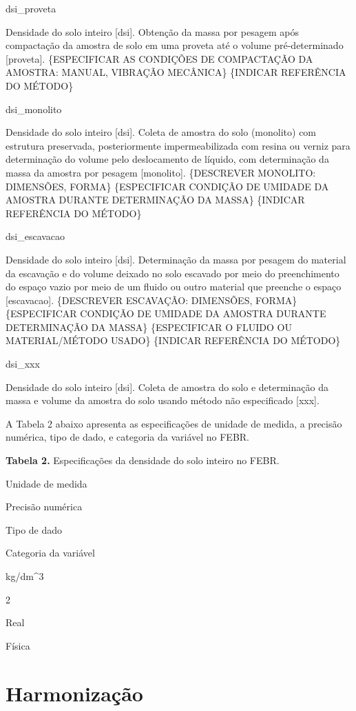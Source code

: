 \documentclass[
]{book}
\begin{document}
dsi\_proveta

Densidade do solo inteiro {[}dsi{]}. Obtenção da massa por pesagem após compactação da amostra de solo em uma proveta até o volume pré-determinado {[}proveta{]}. \{ESPECIFICAR AS CONDIÇÕES DE COMPACTAÇÃO DA AMOSTRA: MANUAL, VIBRAÇÃO MECÂNICA\} \{INDICAR REFERÊNCIA DO MÉTODO\}

dsi\_monolito

Densidade do solo inteiro {[}dsi{]}. Coleta de amostra do solo (monolito) com estrutura preservada, posteriormente impermeabilizada com resina ou verniz para determinação do volume pelo deslocamento de líquido, com determinação da massa da amostra por pesagem {[}monolito{]}. \{DESCREVER MONOLITO: DIMENSÕES, FORMA\} \{ESPECIFICAR CONDIÇÃO DE UMIDADE DA AMOSTRA DURANTE DETERMINAÇÃO DA MASSA\} \{INDICAR REFERÊNCIA DO MÉTODO\}

dsi\_escavacao

Densidade do solo inteiro {[}dsi{]}. Determinação da massa por pesagem do material da escavação e do volume deixado no solo escavado por meio do preenchimento do espaço vazio por meio de um fluido ou outro material que preenche o espaço {[}escavacao{]}. \{DESCREVER ESCAVAÇÃO: DIMENSÕES, FORMA\} \{ESPECIFICAR CONDIÇÃO DE UMIDADE DA AMOSTRA DURANTE DETERMINAÇÃO DA MASSA\} \{ESPECIFICAR O FLUIDO OU MATERIAL/MÉTODO USADO\} \{INDICAR REFERÊNCIA DO MÉTODO\}

dsi\_xxx

Densidade do solo inteiro {[}dsi{]}. Coleta de amostra do solo e determinação da massa e volume da amostra do solo usando método não especificado {[}xxx{]}.

A Tabela 2 abaixo apresenta as especificações de unidade de medida, a precisão numérica, tipo de dado, e categoria da variável no FEBR.

\textbf{Tabela 2.} Especificações da densidade do solo inteiro no FEBR.

Unidade de medida

Precisão numérica

Tipo de dado

Categoria da variável

kg/dm\^{}3

2

Real

Física

\hypertarget{harmonizauxe7uxe3o}{%
\section{Harmonização}\label{harmonizauxe7uxe3o}}
\end{document}

